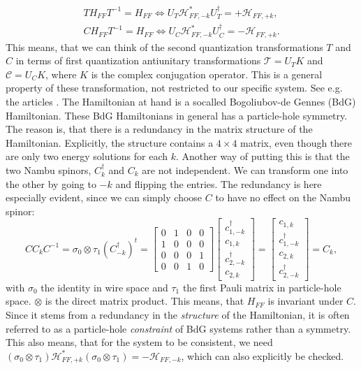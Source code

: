 \begin{align}
TH_{FF}T^{-1} = H_{FF} \Leftrightarrow U_T\mathcal{H}^*_{FF,-k} U^\dagger_T = + \mathcal{H}_{FF,+k}, \nonumber \\
CH_{FF}T^{-1} = H_{FF} \Leftrightarrow U_C\mathcal{H}^*_{FF,-k} U^\dagger_C = - \mathcal{H}_{FF,+k}. 
\label{eq.Symmetryrequirements}
\end{align}
This means, that we can think of the second quantization transformations $T$ and $C$ in terms of first quantization antiunitary transformations $\mathcal{T} = U_TK$ and $\mathcal{C} = U_CK$, where $K$ is the complex conjugation operator. This is a general property of these transformation, not restricted to our specific system. See e.g. the articles \cite{Ludwig.Topology, Chiu.Topology}. The Hamiltonian at hand is a socalled Bogoliubov-de Gennes (BdG) Hamiltonian. These BdG Hamiltonians in general has a particle-hole symmetry. The reason is, that there is a redundancy in the matrix structure of the Hamiltonian. Explicitly, the structure contains a $4\times 4$ matrix, even though there are only two energy solutions for each $k$. Another way of putting this is that the two Nambu spinors, $C^\dagger_k$ and $C_k$ are not independent. We can transform one into the other by going to $-k$ and flipping the entries. The redundancy is here especially evident, since we can simply choose $C$ to have no effect on the Nambu spinor:
\begin{equation}
C C_k C^{-1} =  \sigma_0\otimes \tau_1 (C^\dagger_{-k})^t = \begin{bmatrix} 0 & 1 & 0 & 0 \\ 1 & 0 & 0 & 0 \\ 0 & 0 & 0 & 1 \\ 0 & 0 & 1 & 0 \end{bmatrix} \begin{bmatrix} c^\dagger_{1,-k} \\ c_{1,k} \\ c^\dagger_{2,-k} \\ c_{2,k} \end{bmatrix} = \begin{bmatrix} c_{1,k} \\ c^\dagger_{1,-k} \\ c_{2,k} \\ c^\dagger_{2,-k} \end{bmatrix} = C_k,
\end{equation}
with $\sigma_0$ the identity in wire space and $\tau_1$ the first Pauli matrix in particle-hole space. $\otimes$ is the direct matrix product. This means, that $H_{FF}$ is invariant under $C$. Since it stems from a redundancy in the \textit{structure} of the Hamiltonian, it is often referred to as a particle-hole \textit{constraint} of BdG systems rather than a symmetry. This also means, that for the system to be consistent, we need $(\sigma_0\otimes\tau_1)\mathcal{H}^*_{FF,+k}(\sigma_0\otimes\tau_1) = - \mathcal{H}_{FF,-k}$, which can also explicitly be checked. 

